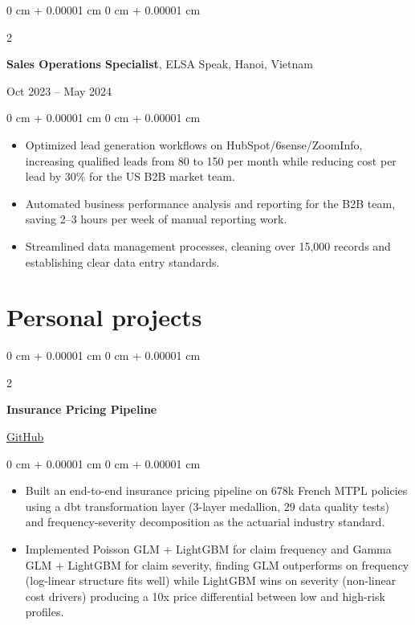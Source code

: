 \documentclass[10pt, letterpaper]{article}
\newenvironment{highlights}{
    \begin{itemize}[
        topsep=0.10 cm,
        parsep=0.10 cm,
        partopsep=0pt,
        itemsep=0pt,
        leftmargin=0 cm + 10pt
    ]
}{
    \end{itemize}
}
\newenvironment{onecolentry}{
    \begin{adjustwidth}{
        0 cm + 0.00001 cm
    }{
        0 cm + 0.00001 cm
    }
}{
    \end{adjustwidth}
}
\newenvironment{twocolentry}[2][]{
    \onecolentry
    \def\secondColumn{#2}
    \setcolumnwidth{\fill, 4.5 cm}
    \begin{paracol}{2}
}{
    \switchcolumn \raggedleft \secondColumn
    \end{paracol}
    \endonecolentry
}
\begin{document}
\vspace{0.15cm}
\begin{twocolentry}{
    Oct 2023 -- May 2024
}
    \textbf{Sales Operations Specialist}, ELSA Speak, Hanoi, Vietnam
\end{twocolentry}
\begin{onecolentry}
    \begin{highlights}
        \item Optimized lead generation workflows on HubSpot/6sense/ZoomInfo, increasing qualified leads from 80 to 150 per month while reducing cost per lead by 30\% for the US B2B market team.
        \item Automated business performance analysis and reporting for the B2B team, saving 2--3 hours per week of manual reporting work.
        \item Streamlined data management processes, cleaning over 15,000 records and establishing clear data entry standards.
    \end{highlights}
\end{onecolentry}

\section{Personal projects}

\begin{twocolentry}{
    \href{https://github.com/NguyenIslandBoy/insurance-pricing}{GitHub}
    }
\textbf{Insurance Pricing Pipeline}
\end{twocolentry}
\begin{onecolentry}
\begin{itemize}
    \item Built an end-to-end insurance pricing pipeline on 678k French MTPL policies using a dbt transformation layer (3-layer medallion, 29 data quality tests) and frequency-severity decomposition as the actuarial industry standard.
    \item Implemented Poisson GLM + LightGBM for claim frequency and Gamma GLM + LightGBM for claim severity, finding GLM outperforms on frequency (log-linear structure fits well) while LightGBM wins on severity (non-linear cost drivers) producing a 10x price differential between low and high-risk profiles.
\end{itemize}
\end{onecolentry}
\vspace{0.15cm}
\end{document}
